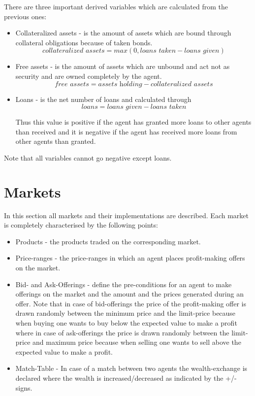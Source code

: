 \documentclass[Bachelorarbeit.tex]{subfiles}
\begin{document}
There are three important derived variables which are calculated from the previous ones:

\begin{itemize}
\item Collateralized assets - is the amount of assets which are bound through collateral obligations because of taken bonds. 
\begin{equation}
\textit{collateralized assets} = max( 0, \textit{loans taken} - \textit{loans given} )
\label{eq:COLLATERALIZED_ASSETS_WITH_BP}
\end{equation}

\item Free assets - is the amount of assets which are unbound and act not as security and are owned completely by the agent.
\begin{equation}
\textit{free assets} = \textit{assets holding} - \textit{collateralized assets}
\end{equation}

\item Loans - is the net number of loans and calculated through 
\begin{equation}
\textit{loans} = \textit{loans given} - \textit{loans taken}
\end{equation}

Thus this value is positive if the agent has granted more loans to other agents than received and it is negative if the agent has received more loans from other agents than granted.
\end{itemize}

Note that all variables cannot go negative except loans.

\section{Markets}
In this section all markets and their implementations are described. Each market is completely characterised by the following points:

\begin{itemize}
\item Products - the products traded on the corresponding market.
\item Price-ranges - the price-ranges in which an agent places profit-making offers on the market.
\item Bid- and Ask-Offerings - define the pre-conditions for an agent to make offerings on the market and the amount and the prices generated during an offer. \medskip
Note that in case of bid-offerings the price of the profit-making offer is drawn randomly between the minimum price and the limit-price because when buying one wants to buy below the expected value to make a profit where in case of ask-offerings the price is drawn randomly between the limit-price and maximum price because when selling one wants to sell above the expected value to make a profit.
\item Match-Table - In case of a match between two agents the wealth-exchange is declared where the wealth is increased/decreased as indicated by the +/- signs.
\end{itemize}
\end{document}
